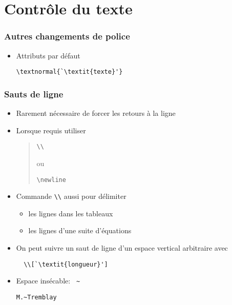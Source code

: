 \section{Contrôle du texte}



\begin{frame}[fragile=singleslide]
  \frametitle{Autres changements de police}
  \begin{itemize}
  \item Attributs par défaut
\begin{lstlisting}
\textnormal{`\textit{texte}'}
\end{lstlisting}
  \end{itemize}
\end{frame}

\begin{frame}[fragile=singleslide]
  \frametitle{Sauts de ligne}
  \begin{itemize}
  \item Rarement nécessaire de forcer les retours à la ligne
  \item Lorsque requis utiliser
    \begin{quote}
      \begin{minipage}{0.3\linewidth}
\begin{lstlisting}[aboveskip=1.5\medskipamount]
  \\
\end{lstlisting}
      \end{minipage}
      \quad ou \quad
      \begin{minipage}{0.3\linewidth}
\begin{lstlisting}[aboveskip=1.5\medskipamount]
  \newline
\end{lstlisting}
      \end{minipage}
    \end{quote}
  \item Commande \verb=\\= aussi pour délimiter
    \begin{itemize}
    \item les lignes dans les tableaux
    \item les lignes d'une suite d'équations
    \end{itemize}
  \item On peut suivre un saut de ligne d'un espace vertical
    arbitraire avec
\begin{lstlisting}
  \\[`\textit{longueur}']
\end{lstlisting}
  \item Espace insécable: \verb= ~ =
\begin{lstlisting}
M.~Tremblay
\end{lstlisting}

  \end{itemize}
\end{frame}

